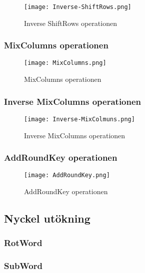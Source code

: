 \begin{figure}[H]
    \centering
    \texttt{[image: Inverse-ShiftRows.png]}
    \caption{Inverse ShiftRows operationen}
    \label{fig:aes-inverse-shiftrows-pic}
\end{figure}

\subsubsection{MixColumns operationen}
\label{sec:aes-mixcolumns}

\begin{figure}[H]
    \centering
    \texttt{[image: MixColumns.png]}
    \caption{MixColumns operationen}
    \label{fig:aes-mixcolumns-pic}
\end{figure}

\subsubsection{Inverse MixColumns operationen}
\label{sec:aes-invers-mixcolumns}

\begin{figure}[H]
    \centering
    \texttt{[image: Inverse-MixColmuns.png]}
    \caption{Inverse MixColumns operationen}
    \label{fig:aes-inverse-mixcolumns-pic}
\end{figure}

\subsubsection{AddRoundKey operationen}
\label{sec:aes-addroundkey}

\begin{figure}[H]
    \centering
    \texttt{[image: AddRoundKey.png]}
    \caption{AddRoundKey operationen}
    \label{fig:aes-addroundkey-pic}
\end{figure}

\subsection{Nyckel utökning}
\label{sec:aes-key-expansion}


\subsubsection{RotWord}
\label{sec:aes-rotword}


\subsubsection{SubWord}
\label{sec:aes-subword}


